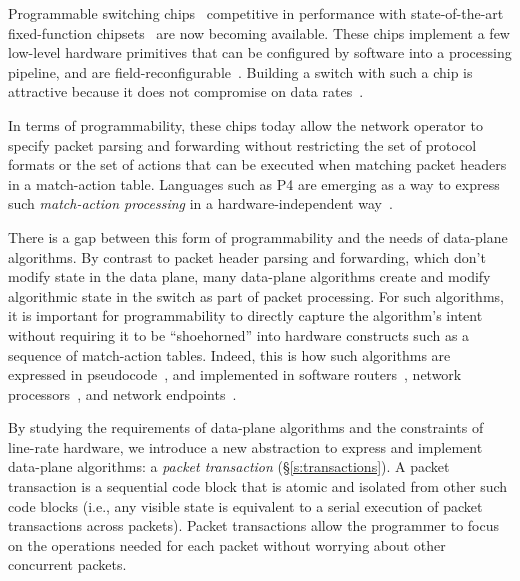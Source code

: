 Programmable switching chips~\cite{flexpipe, xpliant, rmt, corsa,
  uadp, algo_logic} competitive in performance with state-of-the-art
fixed-function chipsets~\cite{trident, tomahawk, mellanox} are now
becoming available. These chips implement a few low-level hardware
primitives that can be configured by software into a processing
pipeline, and are
field-reconfigurable~\cite{xpliant_sdk,xpliant_sdk2,intel_sdk}. Building
a switch with such a chip is attractive because it does not compromise
on data rates~\cite{rmt}.



In terms of programmability, these chips today allow the network
operator to specify packet parsing and forwarding without restricting
the set of protocol formats or the set of actions that can be executed
when matching packet headers in a match-action table. Languages such
as P4 are emerging as a way to express such {\em match-action
  processing} in a hardware-independent way~\cite{p4,p4spec,dc_p4}.

There is a gap between this form of programmability and the needs of
data-plane algorithms.
By contrast to packet header parsing and forwarding, which don't
modify state in the data plane, many data-plane algorithms create and
modify algorithmic state in the switch as part of packet
processing. For such algorithms, it is important for programmability
to directly capture the algorithm's intent without requiring it to be
``shoehorned'' into hardware constructs such as a sequence of
match-action tables. Indeed, this is how such algorithms are expressed
in pseudocode~\cite{red, csfq, codel_code, avq, blue}, and implemented
in software routers~\cite{click, dpdk, routebricks}, network
processors~\cite{packetc, nova}, and network endpoints~\cite{qdisc}.

By studying the requirements of data-plane algorithms and the
constraints of line-rate hardware, we introduce a new abstraction to
express and implement data-plane algorithms: a {\em packet
  transaction} (\S\ref{s:transactions}). A packet transaction is a
sequential code block that is atomic and isolated from other such code
blocks (i.e., any visible state is equivalent to a serial execution of
packet transactions across packets). Packet transactions allow the programmer to
focus on the operations needed for each packet without worrying about
other concurrent packets.

